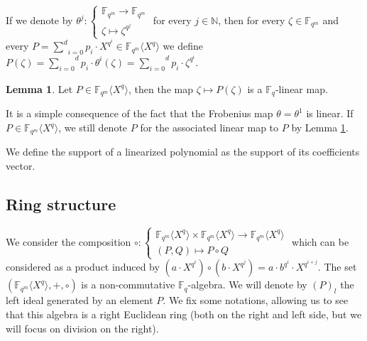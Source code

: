 \documentclass{article}
\theoremstyle{definition}
\newtheorem{lemma}[theorem]{Lemma}
\begin{document}
\noindent If we denote by $\theta^j : \left\{\begin{array}{l}
            \mathbb{F}_{q^m} \longrightarrow \mathbb{F}_{q^m} \\
            \zeta \longmapsto \zeta^{q^j}
      \end{array}\right.$ for every $j \in \mathbb{N}$, then for every $\zeta \in
      \mathbb{F}_{q^m}$ and every $P = \underset{i = 0}{\overset{d}{\sum}} p_i \cdot
      X^{q^i} \in \mathbb{F}_{q^m} \langle X^q \rangle$ we define $P (\zeta) =
      \underset{}{\overset{d}{\underset{i = 0}{\sum}} p_i \cdot \theta^i (\zeta) =
            \overset{d}{\underset{i = 0}{\sum}} p_i \cdot \zeta^{q^i}}$.

\begin{lemma}
      \label{linmap}Let $P \in \mathbb{F}_{q^m} \langle X^q \rangle$, then the map
      $\zeta \longmapsto P (\zeta)$ is a $\mathbb{F}_q$-linear map.
\end{lemma}

\noindent It is a simple consequence of the fact that the Frobenius map $\theta=\theta^1$ is linear. If $P \in \mathbb{F}_{q^m}
      \langle X^q \rangle$, we still denote $P$ for the associated linear map to
$P$ by Lemma \ref{linmap}.

We define the support of a linearized polynomial as the support of its coefficients vector.

\subsection{Ring structure}

We consider the composition $\circ : \left\{\begin{array}{l}
            \mathbb{F}_{q^m} \langle X^q \rangle \times \mathbb{F}_{q^m} \langle X^q
            \rangle \longrightarrow \mathbb{F}_{q^m} \langle X^q \rangle \\
            (P, Q) \longmapsto P \circ Q
      \end{array}\right.$ which can be considered as a product induced by $(a \cdot
      X^{q^i}) \circ (b \cdot X^{q^j}) = a \cdot b^{q^i} \cdot X^{q^{i + j}}$. The
set $(\mathbb{F}_{q^m} \langle X^q \rangle, +, \circ)$ is a non-commutative
$\mathbb{F}_{q}$-algebra. We will denote by $(P)_l$ the left ideal generated by an element $P$. \color{black} We fix some notations, allowing us to see that this
algebra is a right Euclidean ring (both on the right and left side, but we will
focus on division on the right).
\end{document}
